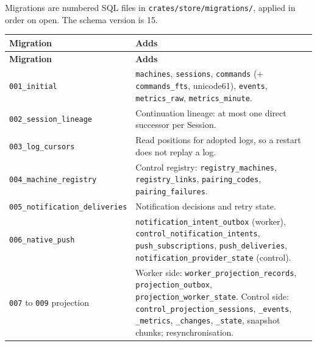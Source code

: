 Migrations are numbered SQL files in \texttt{crates/\allowbreak{}store/\allowbreak{}migrations/\allowbreak{}}, applied in order on open. The schema version is 15.

\begin{small}
\begin{longtable}{>{\raggedright\arraybackslash}p{0.288\dimexpr \linewidth-4\tabcolsep\relax}>{\raggedright\arraybackslash}p{0.712\dimexpr \linewidth-4\tabcolsep\relax}}
\toprule
\textbf{Migration} & \textbf{Adds} \\
\midrule
\endfirsthead
\toprule
\textbf{Migration} & \textbf{Adds} \\
\midrule
\endhead
\texttt{001\_\allowbreak{}initial} & \texttt{machines}, \texttt{sessions}, \texttt{commands} (+ \texttt{commands\_\allowbreak{}fts}, unicode61), \texttt{events}, \texttt{metrics\_\allowbreak{}raw}, \texttt{metrics\_\allowbreak{}minute}. \\
\texttt{002\_\allowbreak{}session\_\allowbreak{}lineage} & Continuation lineage: at most one direct successor per Session. \\
\texttt{003\_\allowbreak{}log\_\allowbreak{}cursors} & Read positions for adopted logs, so a restart does not replay a log. \\
\texttt{004\_\allowbreak{}machine\_\allowbreak{}registry} & Control registry: \texttt{registry\_\allowbreak{}machines}, \texttt{registry\_\allowbreak{}links}, \texttt{pairing\_\allowbreak{}codes}, \texttt{pairing\_\allowbreak{}failures}. \\
\texttt{005\_\allowbreak{}notification\_\allowbreak{}deliveries} & Notification decisions and retry state. \\
\texttt{006\_\allowbreak{}native\_\allowbreak{}push} & \texttt{notification\_\allowbreak{}intent\_\allowbreak{}outbox} (worker), \texttt{control\_\allowbreak{}notification\_\allowbreak{}intents}, \texttt{push\_\allowbreak{}subscriptions}, \texttt{push\_\allowbreak{}deliveries}, \texttt{notification\_\allowbreak{}provider\_\allowbreak{}state} (control). \\
\texttt{007} to \texttt{009} projection & Worker side: \texttt{worker\_\allowbreak{}projection\_\allowbreak{}records}, \texttt{projection\_\allowbreak{}outbox}, \texttt{projection\_\allowbreak{}worker\_\allowbreak{}state}. Control side: \texttt{control\_\allowbreak{}projection\_\allowbreak{}sessions}, \texttt{\_\allowbreak{}events}, \texttt{\_\allowbreak{}metrics}, \texttt{\_\allowbreak{}changes}, \texttt{\_\allowbreak{}state}, snapshot chunks; resynchronisation. \\

\end{longtable}
\end{small}
